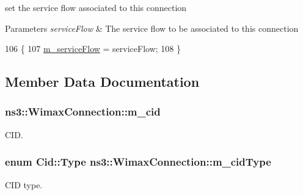 set the service flow associated to this connection 


\begin{DoxyParams}{Parameters}
{\em service\+Flow} & The service flow to be associated to this connection \\
\hline
\end{DoxyParams}

\begin{DoxyCode}
106 \{
107   \hyperlink{classns3_1_1WimaxConnection_a1f584c9abac19d8efc5f9a34ac5306a8}{m\_serviceFlow} = serviceFlow;
108 \}
\end{DoxyCode}


\subsection{Member Data Documentation}
\subsubsection[{\texorpdfstring{m\+\_\+cid}{m_cid}}]{ ns3\+::\+Wimax\+Connection\+::m\+\_\+cid\hspace{0.3cm}{\ttfamily [private]}}\hypertarget{classns3_1_1WimaxConnection_a89b058b93203233f3f9a8790c7ea7e89}{}\label{classns3_1_1WimaxConnection_a89b058b93203233f3f9a8790c7ea7e89}


C\+ID. 

\subsubsection[{\texorpdfstring{m\+\_\+cid\+Type}{m_cidType}}]{\setlength{\rightskip}{0pt plus 5cm}enum {\bf Cid\+::\+Type} ns3\+::\+Wimax\+Connection\+::m\+\_\+cid\+Type\hspace{0.3cm}{\ttfamily [private]}}\hypertarget{classns3_1_1WimaxConnection_a855c085f5f7431cdd6d750fe49239467}{}\label{classns3_1_1WimaxConnection_a855c085f5f7431cdd6d750fe49239467}


C\+ID type. 

